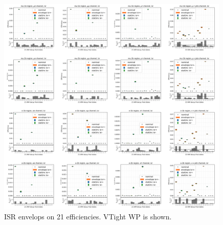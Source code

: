 \begin{figure}
    \centering
    \includegraphics[width=0.99\textwidth]{chapters/Appendix/sectionTTSyst/figures/isr.png}

    

    
    \caption{ISR envelops on 21 efficiencies. VTight WP is shown.}
    \label{fig:appendix:reweighttt:effAfterCorrISR}
\end{figure}




